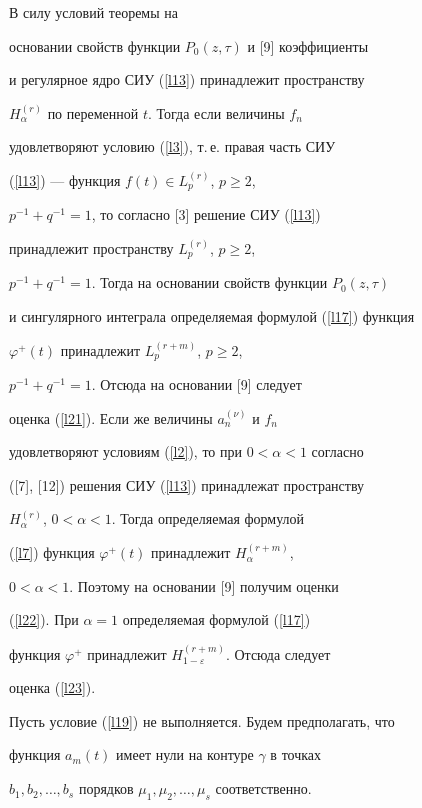 \begin{pf}


В силу условий теоремы на


основании свойств функции $P_0(z,\tau)$ и [9] коэффициенты


и регулярное ядро СИУ (\ref{l13}) принадлежит пространству


$H_\alpha^{(r)}$ по переменной $t$. Тогда если величины $f_n$


удовлетворяют условию (\ref{l3}), т.\,е. правая часть СИУ


(\ref{l13}) --- функция $f(t)\in L_p^{(r)}$, $p\geqslant 2$,


$p^{-1}+q^{-1}=1$, то согласно [3] решение СИУ (\ref{l13})


принадлежит пространству $L_p^{(r)}$, $p \geqslant 2$,


$p^{-1}+q^{-1}=1$. Тогда на основании свойств функции $P_0(z,\tau)$


и сингулярного интеграла определяемая формулой (\ref{l17}) функция


$\varphi^+(t)$ принадлежит $L_p^{(r+m)}$, $p\geqslant 2$,


$p^{-1}+q^{-1}=1$. Отсюда на основании [9] следует


оценка (\ref{l21}). Если же величины $a_n^{(\nu)}$ и $f_n$


удовлетворяют условиям (\ref{l2}), то при $0<\alpha<1$ согласно


([7], [12]) решения СИУ (\ref{l13}) принадлежат пространству


$H_\alpha^{(r)}$, $0<\alpha<1$. Тогда определяемая формулой


(\ref{l7}) функция $\varphi^+(t)$ принадлежит $H_\alpha^{(r+m)}$,


$0<\alpha<1$. Поэтому на основании [9] получим оценки


(\ref{l22}). При $\alpha=1$ определяемая формулой (\ref{l17})


функция $\varphi^+$ принадлежит $H_{1-\varepsilon}^{(r+m)}$. Отсюда следует


оценка (\ref{l23}).


\end{pf}





Пусть условие (\ref{l19}) не выполняется. Будем предполагать, что


функция $a_m(t)$ имеет нули на контуре $\gamma$ в точках


$b_1,b_2,\dotsc,b_s$  порядков $\mu_1,\mu_2,\dotsc,\mu_s$ соответственно.


